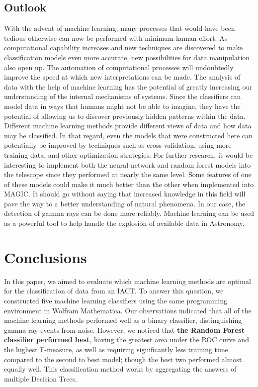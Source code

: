 \documentclass[a4paper, 12pt]{report}
\theoremstyle{definition}
\begin{document}

\section{Outlook}

With the advent of machine learning, many processes that would have been tedious otherwise can now be performed with minimum human effort. As computational capability increases and new techniques are discovered to make classification models even more accurate, new possibilities for data manipulation also open up. The automation of computational processes will undoubtedly improve the speed at which new interpretations can be made. The analysis of data with the help of machine learning has the potential of greatly increasing our understanding of the internal mechanisms of systems. Since the classifiers can model data in ways that humans might not be able to imagine, they have the potential of allowing us to discover previously hidden patterns within the data. Different machine learning methods provide different views of data and how data may be classified. In that regard, even the models that were constructed here can potentially be improved by techniques such as cross-validation, using more training data, and other optimization strategies. For further research, it would be interesting to implement both the neural network and random forest models into the telescope since they performed at nearly the same level. Some features of one of these models could make it much better than the other when implemented into MAGIC. It should go without saying that increased knowledge in this field will pave the way to a better understanding of natural phenomena. In our case, the detection of gamma rays can be done more reliably. Machine learning can be used as a powerful tool to help handle the explosion of available data in Astronomy.

\chapter{Conclusions}



In this paper, we aimed to evaluate which machine learning methods are optimal for the classification of data from an IACT. To answer this question, we constructed five machine learning classifiers using the same programming environment in Wolfram Mathematica. Our observations indicated that all of the machine learning methods performed well as a binary classifier, distinguishing gamma ray events from noise. However, we noticed that \textbf{the Random Forest classifier performed best}, having the greatest area under the ROC curve and the highest F-measure, as well as requiring significantly less training time compared to the second to best model; though the best two performed almost equally well. This classification method works by aggregating the answers of multiple Decision Trees.
\end{document}
